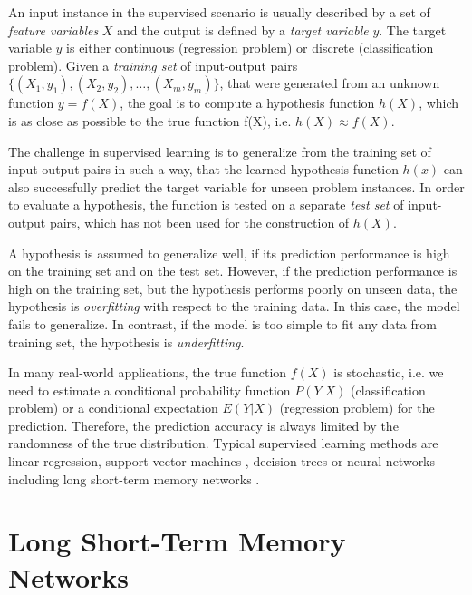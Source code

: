 An input instance in the supervised scenario is usually described by a set of \textit{feature variables} $X$ and the output is defined by a \textit{target variable} $y$.
The target variable $y$ is either continuous (regression problem) or discrete (classification problem).
Given a \textit{training set} of input-output pairs $\{(X_1, y_1), (X_2, y_2), \dots, (X_m,y_m)\}$, that were generated from an unknown function $y = f(X)$, the goal is to compute a hypothesis function $h(X)$, which is as close as possible to the true function f(X), i.e. $h(X) \approx f(X)$.

The challenge in supervised learning is to generalize from the training set of input-output pairs in such a way, that the learned hypothesis function $h(x)$ can also successfully predict the target variable for unseen problem instances.
In order to evaluate a hypothesis, the function is tested on a separate \textit{test set} of input-output pairs, which has not been used for the construction of $h(X)$.

A hypothesis is assumed to generalize well, if its prediction performance is high on the training set and on the test set.
However, if the prediction performance is high on the training set, but the hypothesis performs poorly on unseen data, the hypothesis is \textit{overfitting} with respect to the training data.
In this case, the model fails to generalize.
In contrast, if the model is too simple to fit any data from training set, the hypothesis is \textit{underfitting}.

In many real-world applications, the true function $f(X)$ is stochastic, i.e. we need to estimate a conditional probability function $P(Y | X)$ (classification problem) or a conditional expectation $E(Y | X)$ (regression problem) for the prediction.
Therefore, the prediction accuracy is always limited by the randomness of the true distribution.
Typical supervised learning methods are linear regression, support vector machines \cite{DBLP:journals/ml/CortesV95}, decision trees \cite{DBLP:journals/ml/Quinlan86} or neural networks including long short-term memory networks \cite{DBLP:journals/neco/HochreiterS97}.
\section{Long Short-Term Memory Networks}

